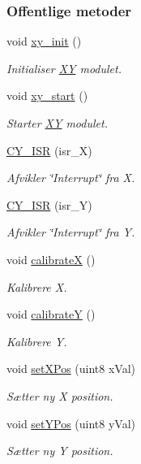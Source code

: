 \subsubsection*{Offentlige metoder}
\begin{DoxyCompactItemize}
\item 
void \hyperlink{class_x_y_aaf6d50e1866014a76b1b15325d2dba4b}{xy\+\_\+init} ()
\begin{DoxyCompactList}\small\item\em Initialiser \hyperlink{class_x_y}{XY} modulet. \end{DoxyCompactList}\item 
void \hyperlink{class_x_y_a47c6cc7fae92395e4d1231428c7070d4}{xy\+\_\+start} ()
\begin{DoxyCompactList}\small\item\em Starter \hyperlink{class_x_y}{XY} modulet. \end{DoxyCompactList}\item 
\hyperlink{class_x_y_acf3833934859a01c669d97fc4dfd7f41}{C\+Y\+\_\+\+I\+SR} (isr\+\_\+X)
\begin{DoxyCompactList}\small\item\em Afvikler \char`\"{}\+Interrupt\char`\"{} fra X. \end{DoxyCompactList}\item 
\hyperlink{class_x_y_ac83f0a0694002bf5e18e2d5bf499ba7e}{C\+Y\+\_\+\+I\+SR} (isr\+\_\+Y)
\begin{DoxyCompactList}\small\item\em Afvikler \char`\"{}\+Interrupt\char`\"{} fra Y. \end{DoxyCompactList}\item 
void \hyperlink{class_x_y_a852d7d757cec8e85e0b436969d0ce237}{calibrateX} ()
\begin{DoxyCompactList}\small\item\em Kalibrere X. \end{DoxyCompactList}\item 
void \hyperlink{class_x_y_a86751f168bdc352fa109644298829609}{calibrateY} ()
\begin{DoxyCompactList}\small\item\em Kalibrere Y. \end{DoxyCompactList}\item 
void \hyperlink{class_x_y_ac4bc2d178bbf432fc918391abd379af6}{set\+X\+Pos} (uint8 x\+Val)
\begin{DoxyCompactList}\small\item\em Sætter ny X position. \end{DoxyCompactList}\item 
void \hyperlink{class_x_y_adbc3a49d939491e88137a7677ad889f3}{set\+Y\+Pos} (uint8 y\+Val)
\begin{DoxyCompactList}\small\item\em Sætter ny Y position. \end{DoxyCompactList}\end{DoxyCompactItemize}
